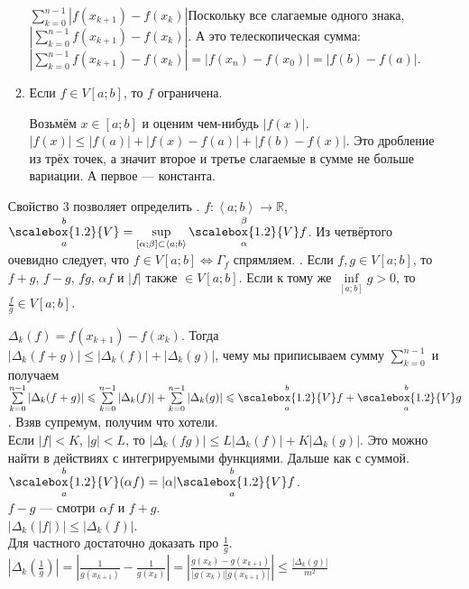 \documentclass{article}
\newcommand*{\ab}[1][a;b]{{\left\langle #1\right\rangle}}
\newcommand*{\Var}[2]{{\overset{#2}{\underset{#1}{\scalebox{1.2}{V}}}}}
\begin{document}
\begin{itemize}
\begin{enumerate}
            \begin{Proof}
                $\sum\limits_{k=0}^{n-1}|f(x_{k+1})-f(x_k)|$Поскольку все слагаемые одного знака, $\left|\sum\limits_{k=0}^{n-1}f(x_{k+1})-f(x_k)\right|$. А это телескопическая сумма: $\left|\sum\limits_{k=0}^{n-1}f(x_{k+1})-f(x_k)\right|=|f(x_n)-f(x_0)|=|f(b)-f(a)|$.
            \end{Proof}
            \item Если $f\in V[a;b]$, то $f$ ограничена.
            \begin{Proof}
                Возьмём $x\in[a;b]$ и оценим чем-нибудь $|f(x)|$.\\
                $|f(x)|\leqslant|f(a)|+|f(x)-f(a)|+|f(b)-f(x)|$. Это дробление из трёх точек, а значит второе и третье слагаемые в сумме не больше вариации. А первое --- константа.
            \end{Proof}
        \end{enumerate}
        \dfn Свойство 3 позволяет определить . $f\colon\ab\to\mathbb R$, $\Var ab=\sup\limits_{[\alpha;\beta]\subset\ab}\Var\alpha\beta f$.
        \thm Из четвёртого очевидно следует, что $f\in V[a;b]\Leftrightarrow\Gamma_f$ спрямляем.
        \thm {}. Если $f,g\in V[a;b]$, то $f+g$, $f-g$, $fg$, $\alpha f$ и $|f|$ также $\in V[a;b]$. Если к тому же $\inf\limits_{[a;b]}g>0$, то $\frac fg\in V[a;b]$.
        \begin{Proof}
            $\Delta_k(f)=f(x_{k+1})-f(x_k)$. Тогда\\
            $|\Delta_k(f+g)|\leqslant|\Delta_k(f)|+|\Delta_k(g)|$, чему мы приписываем сумму $\sum\limits_{k=0}^{n-1}$ и получаем $\sum\limits_{k=0}^{n-1}|\Delta_k(f+g)|\leqslant\sum\limits_{k=0}^{n-1}|\Delta_k(f)|+\sum\limits_{k=0}^{n-1}|\Delta_k(g)|\leqslant \Var abf+\Var abg$. Взяв супремум, получим что хотели.\\
            Если $|f|<K$, $|g|<L$, то $|\Delta_k(fg)|\leqslant L|\Delta_k(f)|+K|\Delta_k(g)|$. Это можно найти в действиях с интегрируемыми функциями. Дальше как с суммой.\\
            $\Var ab(\alpha f)=|\alpha|\Var ab f$.\\
            $f-g$ --- смотри $\alpha f$ и $f+g$.\\
            $|\Delta_k(|f|)|\leqslant |\Delta_k(f)|$.\\
            Для частного достаточно доказать про $\frac1g$. $|\Delta_k(\frac1g)|=\left|\frac1{g(x_{k+1})}-\frac1{g(x_k)}\right|=\left|\frac{g(x_k)-g(x_{k+1})}{|g(x_k)||g(x_{k+1})|}\right|\leqslant\frac{|\Delta_k(g)|}{m^2}$

\end{Proof}
\end{itemize}
\end{document}
